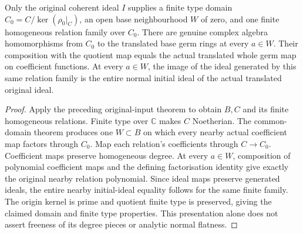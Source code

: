 \begin{theorem}
\label{hir:relative-normal-original-common-domain-coefficient-initial-family}
\leanok
{}
Only the original coherent ideal $I$ supplies a finite type domain
$C_0=C/\ker(\rho_0|_C)$, an open base neighbourhood $W$ of zero,
and one finite homogeneous relation family over $C_0$. There are genuine
complex algebra homomorphisms from $C_0$ to the translated base germ rings
at every $a\in W$. Their composition with the quotient map equals the
actual translated whole germ map on coefficient functions. At every
$a\in W$, the image of the ideal generated by this same relation family is
the entire normal initial ideal of the actual translated original ideal.
\end{theorem}
\begin{proof}
Apply the preceding original-input theorem to obtain $B,C$ and its finite
homogeneous relations. Finite type over $\mathbb C$ makes $C$ Noetherian.
The common-domain theorem produces one $W\subset B$ on which every
nearby actual coefficient map factors through $C_0$. Map each relation's
coefficients through $C\to C_0$. Coefficient maps preserve homogeneous
degree. At every $a\in W$, composition of polynomial coefficient maps
and the defining factorisation identity give exactly the original nearby
relation polynomial. Since ideal maps preserve generated ideals, the entire
nearby initial-ideal equality follows for the same finite family. The
origin kernel is prime and quotient finite type is preserved, giving the
claimed domain and finite type properties. This presentation alone does not
assert freeness of its degree pieces or analytic normal flatness.
\end{proof}
